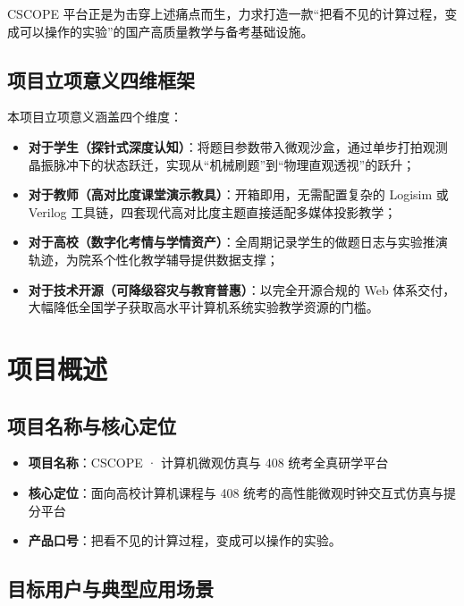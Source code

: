 \documentclass[UTF8,a4paper,11pt]{ctexart}
\begin{document}
CSCOPE 平台正是为击穿上述痛点而生，力求打造一款“把看不见的计算过程，变成可以操作的实验”的国产高质量教学与备考基础设施。

\subsection{项目立项意义四维框架}
本项目立项意义涵盖四个维度：
\begin{itemize}
    \item \textbf{对于学生（探针式深度认知）}：将题目参数带入微观沙盒，通过单步打拍观测晶振脉冲下的状态跃迁，实现从“机械刷题”到“物理直观透视”的跃升；
    \item \textbf{对于教师（高对比度课堂演示教具）}：开箱即用，无需配置复杂的 Logisim 或 Verilog 工具链，四套现代高对比度主题直接适配多媒体投影教学；
    \item \textbf{对于高校（数字化考情与学情资产）}：全周期记录学生的做题日志与实验推演轨迹，为院系个性化教学辅导提供数据支撑；
    \item \textbf{对于技术开源（可降级容灾与教育普惠）}：以完全开源合规的 Web 体系交付，大幅降低全国学子获取高水平计算机系统实验教学资源的门槛。
\end{itemize}

\section{项目概述}

\subsection{项目名称与核心定位}
\begin{itemize}
    \item \textbf{项目名称}：CSCOPE · 计算机微观仿真与 408 统考全真研学平台
    \item \textbf{核心定位}：面向高校计算机课程与 408 统考的高性能微观时钟交互式仿真与提分平台
    \item \textbf{产品口号}：把看不见的计算过程，变成可以操作的实验。
\end{itemize}

\subsection{目标用户与典型应用场景}
\end{document}
